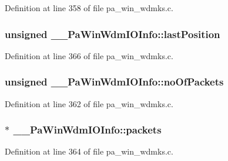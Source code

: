 Definition at line 358 of file pa\+\_\+win\+\_\+wdmks.\+c.

\subsubsection[{\texorpdfstring{last\+Position}{lastPosition}}]{\setlength{\rightskip}{0pt plus 5cm}unsigned \+\_\+\+\_\+\+Pa\+Win\+Wdm\+I\+O\+Info\+::last\+Position}\hypertarget{struct_____pa_win_wdm_i_o_info_a9531d0af0db86e249feae8339dd7bfaf}{}\label{struct_____pa_win_wdm_i_o_info_a9531d0af0db86e249feae8339dd7bfaf}


Definition at line 366 of file pa\+\_\+win\+\_\+wdmks.\+c.

\subsubsection[{\texorpdfstring{no\+Of\+Packets}{noOfPackets}}]{\setlength{\rightskip}{0pt plus 5cm}unsigned \+\_\+\+\_\+\+Pa\+Win\+Wdm\+I\+O\+Info\+::no\+Of\+Packets}\hypertarget{struct_____pa_win_wdm_i_o_info_a09ddd7e42c3b90a750e3769f20258201}{}\label{struct_____pa_win_wdm_i_o_info_a09ddd7e42c3b90a750e3769f20258201}


Definition at line 362 of file pa\+\_\+win\+\_\+wdmks.\+c.

\subsubsection[{\texorpdfstring{packets}{packets}}]{$\ast$ \+\_\+\+\_\+\+Pa\+Win\+Wdm\+I\+O\+Info\+::packets}\hypertarget{struct_____pa_win_wdm_i_o_info_ad1658ab65cd0eaf8d0c0c3b1904125df}{}\label{struct_____pa_win_wdm_i_o_info_ad1658ab65cd0eaf8d0c0c3b1904125df}


Definition at line 364 of file pa\+\_\+win\+\_\+wdmks.\+c.

